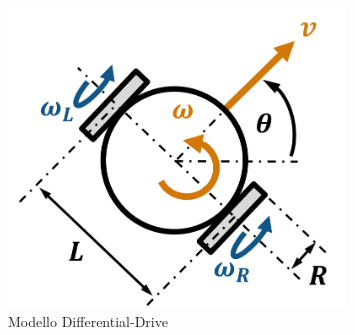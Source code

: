 \documentclass[14pt,a4paper]{extarticle}
\begin{document}
\begin{figure}[h]
\centering
\caption{Modello Differential-Drive \cite{toolbox}} \label{dd}
\includegraphics[width=0.8\textwidth]{DD.png}
\end{figure}
\end{document}
